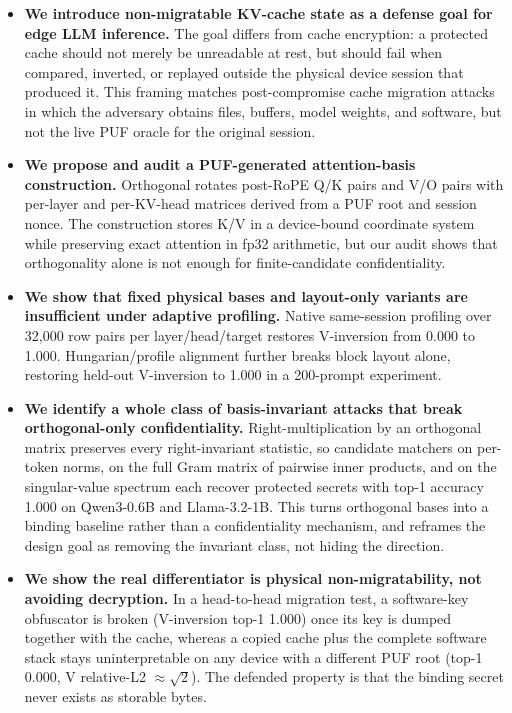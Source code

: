 \begin{itemize}
    \item \textbf{We introduce non-migratable KV-cache state as a defense goal for edge LLM inference.} The goal differs from cache encryption: a protected cache should not merely be unreadable at rest, but should fail when compared, inverted, or replayed outside the physical device session that produced it. This framing matches post-compromise cache migration attacks in which the adversary obtains files, buffers, model weights, and software, but not the live PUF oracle for the original session.
    \item \textbf{We propose and audit a PUF-generated attention-basis construction.} Orthogonal \sys{} rotates post-RoPE Q/K pairs and V/O pairs with per-layer and per-KV-head matrices derived from a PUF root and session nonce. The construction stores K/V in a device-bound coordinate system while preserving exact attention in fp32 arithmetic, but our audit shows that orthogonality alone is not enough for finite-candidate confidentiality.
    \item \textbf{We show that fixed physical bases and layout-only variants are insufficient under adaptive profiling.} Native same-session profiling over 32,000 row pairs per layer/head/target restores V-inversion from 0.000 to 1.000. Hungarian/profile alignment further breaks block layout alone, restoring held-out V-inversion to 1.000 in a 200-prompt experiment.
    \item \textbf{We identify a whole class of basis-invariant attacks that break orthogonal-only confidentiality.} Right-multiplication by an orthogonal matrix preserves every right-invariant statistic, so candidate matchers on per-token norms, on the full Gram matrix of pairwise inner products, and on the singular-value spectrum each recover protected secrets with top-1 accuracy 1.000 on Qwen3-0.6B and Llama-3.2-1B. This turns orthogonal bases into a binding baseline rather than a confidentiality mechanism, and reframes the design goal as removing the invariant class, not hiding the direction.
    \item \textbf{We show the real differentiator is physical non-migratability, not avoiding decryption.} In a head-to-head migration test, a software-key obfuscator is broken (V-inversion top-1 1.000) once its key is dumped together with the cache, whereas a copied \sys{} cache plus the complete software stack stays uninterpretable on any device with a different PUF root (top-1 0.000, V relative-L2 $\approx\sqrt{2}$). The defended property is that the binding secret never exists as storable bytes.

\end{itemize}
